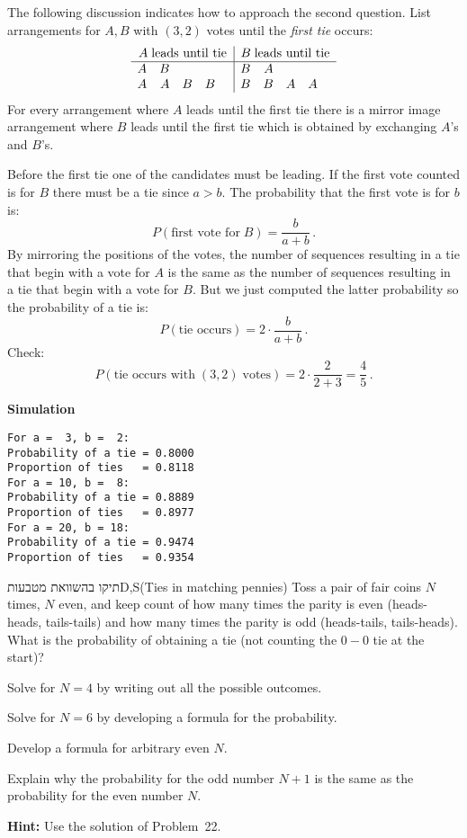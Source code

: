The following discussion indicates how to approach the second question. List arrangements for $A,B$ with $(3,2)$ votes until the \emph{first tie} occurs:
\[
\begin{array}{rrrrr|rrrrr}
\multicolumn{5}{c|}{A \;\textrm{leads until tie}} &
\multicolumn{5}{c}{B \;\textrm{leads until tie}}\\\hline
A & B &&& &B & A & & &\\
A & A & B & B && B & B & A & A&\\
\end{array}
\]
For every arrangement where $A$ leads until the first tie there is a mirror image arrangement where $B$ leads until the first tie which is obtained by exchanging $A$'s and $B$'s.

Before the first tie one of the candidates must be leading. If the first vote counted is for $B$ there must be a tie since $a>b$. The probability that the first vote is for $b$ is:
\[
P(\textrm{first vote for}\;B)=\frac{b}{a+b}\,.
\]
By mirroring the positions of the votes, the number of sequences resulting in a tie that begin with a vote for $A$ is the same as the number of sequences resulting in a tie that begin with a vote for $B$. But we just computed the latter probability so the probability of a tie is:
\[
P(\textrm{tie occurs})=2\cdot\frac{b}{a+b}\,.
\]
Check:
\[
P(\textrm{tie occurs with}\;(3,2)\;\textrm{votes})=2\cdot\frac{2}{2+3}=\frac{4}{5}\,.
\]

\textbf{Simulation}
\begin{verbatim}
For a =  3, b =  2:
Probability of a tie = 0.8000
Proportion of ties   = 0.8118
For a = 10, b =  8:
Probability of a tie = 0.8889
Proportion of ties   = 0.8977
For a = 20, b = 18:
Probability of a tie = 0.9474
Proportion of ties   = 0.9354
\end{verbatim}



\begin{prob}{תיקו בהשוואת מטבעות}{D,S}{(Ties in matching pennies)}
Toss a pair of fair coins $N$ times, $N$ even, and keep count of how many times the parity is even (heads-heads, tails-tails) and how many times the parity is odd (heads-tails, tails-heads). What is the probability of obtaining a tie (not counting the $0-0$ tie at the start)?

 Solve for $N=4$ by writing out all the possible outcomes.

 Solve for $N=6$ by developing a formula for the probability.

 Develop a formula for arbitrary even $N$.

 Explain why the probability for the odd number $N+1$ is the same as the probability for the even number $N$.

\textbf{Hint:} Use the solution of Problem~22.
\end{prob}


